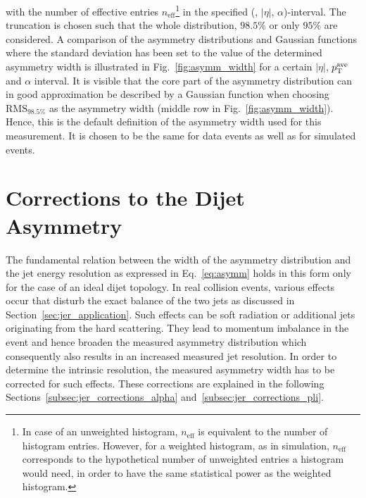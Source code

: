 with the number of effective entries $n_\mathrm{eff}$\footnote{In case of an unweighted histogram, $n_\mathrm{eff}$ is equivalent to the number of histogram entries. However, for a weighted histogram, as \eg in simulation, $n_\mathrm{eff}$ corresponds to the hypothetical number of unweighted entries a histogram would need, in order to have the same statistical power as the weighted histogram.} in the specified (\ptave, $|\eta|$, $\alpha$)-interval. The truncation is chosen such that the whole distribution, $98.5\%$ or only $95\%$ are considered. A comparison of the asymmetry distributions and Gaussian functions where the standard deviation has been set to the value of the determined asymmetry width is illustrated in Fig.~\ref{fig:asymm_width} for a certain $|\eta|$, $p_{\text{T}}^\mathrm{ave}$ and $\alpha$ interval. It is visible that the core part of the asymmetry distribution can in good approximation be described by a Gaussian function when choosing $\mathrm{RMS}_{98.5\%}$ as the asymmetry width (\cf middle row in Fig.~\ref{fig:asymm_width}). Hence, this is the default definition of the asymmetry width used for this measurement. It is chosen to be the same for data events as well as for simulated events.  

\section{Corrections to the Dijet Asymmetry}
\label{sec:jer_corrections}
The fundamental relation between the width of the asymmetry distribution and the jet energy resolution as expressed in Eq.~\ref{eq:asymm} holds in this form only for the case of an ideal dijet topology. In real collision events, various effects occur that disturb the exact balance of the two jets as discussed in Section~\ref{sec:jer_application}. Such effects can be soft radiation or additional jets originating from the hard scattering. They lead to momentum imbalance in the event and hence broaden the measured asymmetry distribution which consequently also results in an increased measured jet resolution. In order to determine the intrinsic resolution, the measured asymmetry width has to be corrected for such effects. These corrections are explained in the following Sections~\ref{subsec:jer_corrections_alpha} and~\ref{subsec:jer_corrections_pli}.

